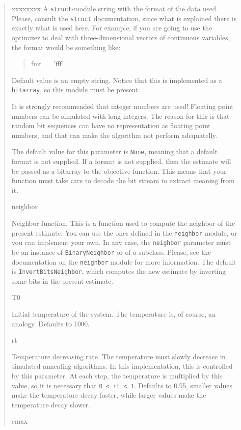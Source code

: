 \begin{boxedminipage}{\funcwidth}
\begin{quote}
\begin{Ventry}{xxxxxxxx}
A \texttt{struct}-module string with the format of the data used. Please,
consult the \texttt{struct} documentation, since what is explained there
is exactly what is used here. For example, if you are going to use
the optimizer to deal with three-dimensional vectors of continuous
variables, the format would be something like:
%
\begin{quote}{\ttfamily \raggedright \noindent
fmt~=~'fff'
}
\end{quote}

Default value is an empty string. Notice that this is implemented as
a \texttt{bitarray}, so this module must be present.

It is strongly recommended that integer numbers are used! Floating
point numbers can be simulated with long integers. The reason for
this is that random bit sequences can have no representation as
floating point numbers, and that can make the algorithm not perform
adequatelly.

The default value for this parameter is \texttt{None}, meaning that a
default format is not supplied. If a format is not supplied, then
the estimate will be passed as a bitarray to the objective function.
This means that your function must take care to decode the bit
stream to extract meaning from it.
          \item[neighbor]


Neighbor function. This is a function used to compute the neighbor
of the present estimate. You can use the ones defined in the
\texttt{neighbor} module, or you can implement your own. In any case, the
\texttt{neighbor} parameter must be an instance of \texttt{BinaryNeighbor} or
of a subclass. Please, see the documentation on the \texttt{neighbor}
module for more information. The default is \texttt{InvertBitsNeighbor},
which computes the new estimate by inverting some bits in the
present estimate.
          \item[T0]


Initial temperature of the system. The temperature is, of course, an
analogy. Defaults to 1000.
          \item[rt]


Temperature decreasing rate. The temperature must slowly decrease in
simulated annealing algorithms. In this implementation, this is
controlled by this parameter. At each step, the temperature is
multiplied by this value, so it is necessary that \texttt{0 < rt < 1}.
Defaults to 0.95, smaller values make the temperature decay faster,
while larger values make the temperature decay slower.
          \item[emax]



\end{Ventry}
\end{quote}
\end{boxedminipage}

